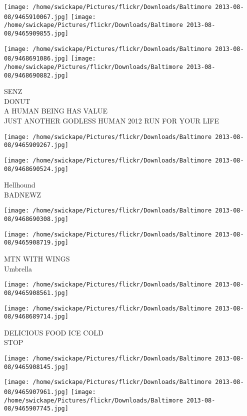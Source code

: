 \documentclass[10pt,letterpaper]{article}
\begin{document}
\texttt{[image: /home/swickape/Pictures/flickr/Downloads/Baltimore 2013-08-08/9465910067.jpg]}
\texttt{[image: /home/swickape/Pictures/flickr/Downloads/Baltimore 2013-08-08/9465909855.jpg]}

\texttt{[image: /home/swickape/Pictures/flickr/Downloads/Baltimore 2013-08-08/9468691086.jpg]}
\texttt{[image: /home/swickape/Pictures/flickr/Downloads/Baltimore 2013-08-08/9468690882.jpg]}

SENZ\\
DONUT\\
A HUMAN BEING HAS VALUE\\
JUST ANOTHER GODLESS HUMAN 2012 RUN FOR YOUR LIFE
\pagebreak

\texttt{[image: /home/swickape/Pictures/flickr/Downloads/Baltimore 2013-08-08/9465909267.jpg]}

\vspace{0.25in}
\texttt{[image: /home/swickape/Pictures/flickr/Downloads/Baltimore 2013-08-08/9468690524.jpg]}

Hellhound\\
BADNEWZ
\pagebreak

\texttt{[image: /home/swickape/Pictures/flickr/Downloads/Baltimore 2013-08-08/9468690308.jpg]}

\vspace{0.25in}
\texttt{[image: /home/swickape/Pictures/flickr/Downloads/Baltimore 2013-08-08/9465908719.jpg]}

MTN WITH WINGS\\
Umbrella
\pagebreak

\texttt{[image: /home/swickape/Pictures/flickr/Downloads/Baltimore 2013-08-08/9465908561.jpg]}

\vspace{0.25in}
\texttt{[image: /home/swickape/Pictures/flickr/Downloads/Baltimore 2013-08-08/9468689714.jpg]}

DELICIOUS FOOD ICE COLD\\
STOP
\pagebreak

\texttt{[image: /home/swickape/Pictures/flickr/Downloads/Baltimore 2013-08-08/9465908145.jpg]}

\vspace{0.25in}
\texttt{[image: /home/swickape/Pictures/flickr/Downloads/Baltimore 2013-08-08/9465907961.jpg]}
\texttt{[image: /home/swickape/Pictures/flickr/Downloads/Baltimore 2013-08-08/9465907745.jpg]}
\end{document}

